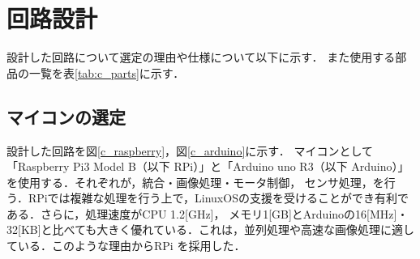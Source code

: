 \section{回路設計}
設計した回路について選定の理由や仕様について以下に示す．
また使用する部品の一覧を表\ref{tab:c_parts}に示す．

\subsection{マイコンの選定}
設計した回路を図\ref{c_raspberry}，図\ref{c_arduino}に示す．
マイコンとして「Raspberry Pi3 Model B（以下 RPi）」と「Arduino uno R3（以下 Arduino）」を使用する．それぞれが，統合・画像処理・モータ制御，
センサ処理，を行う．RPiでは複雑な処理を行う上で，LinuxOSの支援を受けることができ有利である．さらに，処理速度がCPU 1.2[GHz]，
メモリ1[GB]とArduinoの16[MHz]・32[KB]と比べても大きく優れている．これは，並列処理や高速な画像処理に適している．このような理由からRPi
を採用した．

